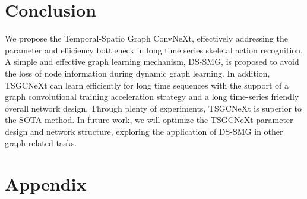 \documentclass[10pt,twocolumn,letterpaper]{article}
\begin{document}
\section{Conclusion}
We propose the Temporal-Spatio Graph ConvNeXt, effectively addressing the parameter and efficiency bottleneck in long time series skeletal action recognition. A simple and effective graph learning mechanism, DS-SMG, is proposed to avoid the loss of node information during dynamic graph learning. In addition, TSGCNeXt can learn efficiently for long time sequences with the support of a graph convolutional training acceleration strategy and a long time-series friendly overall network design. Through plenty of experiments, TSGCNeXt is superior to the SOTA method. In future work, we will optimize the TSGCNeXt parameter design and network structure, exploring the application of DS-SMG in other graph-related tasks.
{\small


}

\newpage

\appendix

\section{Appendix}
\end{document}
